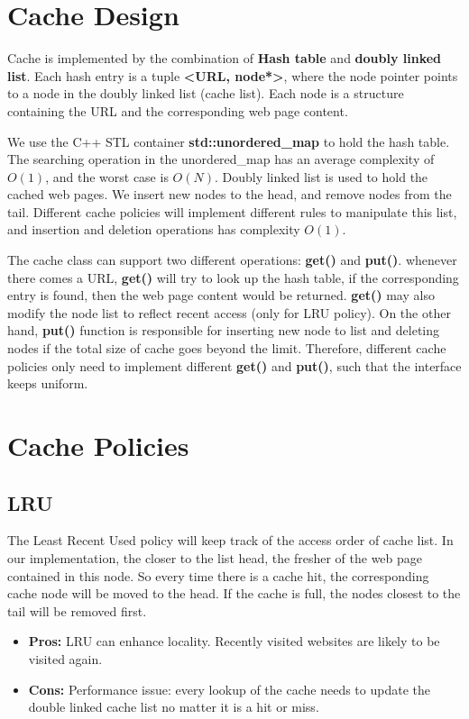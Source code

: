 \documentclass[paper=a4, fontsize=11pt]{scrartcl} %
\numberwithin{equation}{section} %
\numberwithin{figure}{section} %
\numberwithin{table}{section} %
\begin{document}
\section{Cache Design}

Cache is implemented by the combination of \textbf{Hash table} 
and \textbf{doubly linked list}. Each hash entry is 
a tuple \textbf{<URL, node*>}, where the node pointer points to a node
in the doubly linked list (cache list). Each node is a structure
containing the URL and the corresponding web page content.

\vspace{0.5em}

We use the C++ STL container \textbf{std::unordered\_map} to hold the 
hash table. The searching operation in the unordered\_map
has an average complexity of $O(1)$, and the worst case is $O(N)$. Doubly
linked list is used to hold the cached web pages. We insert new nodes
to the head, and remove nodes from the tail. Different cache policies will
implement different rules to manipulate this list, and insertion and
deletion operations has complexity $O(1)$.

\vspace{0.5em}

The cache class can support two different operations: \textbf{get()} and
\textbf{put()}. whenever there comes a URL, \textbf{get()} will try to look
up the hash table, if the corresponding entry is found, then the web page
content would be returned. 
\textbf{get()} may also modify the node list to reflect recent access
(only for LRU policy). On the other hand, \textbf{put()} function is
responsible for inserting new node to list and deleting nodes if the
total size of cache goes beyond the limit. Therefore, different cache 
policies only need to implement different \textbf{get()} and 
\textbf{put()}, 
such that the interface keeps uniform.

\section{Cache Policies}

\subsection{LRU}
The Least Recent Used policy will keep track of the access order 
of cache list. In our implementation, the closer to the list head, 
the fresher of the web page contained in this node. So every time 
there is a cache hit, the corresponding cache node will be moved to
the head. If the cache is full, the nodes closest to the tail will
be removed first.
\begin{itemize}
\item \textbf{Pros:} LRU can enhance locality. Recently visited websites
are likely to be visited again.
\item \textbf{Cons:} Performance issue: every lookup of the cache needs
to update the double linked cache list no matter it is a hit or
miss.
\end{itemize}
\end{document}
